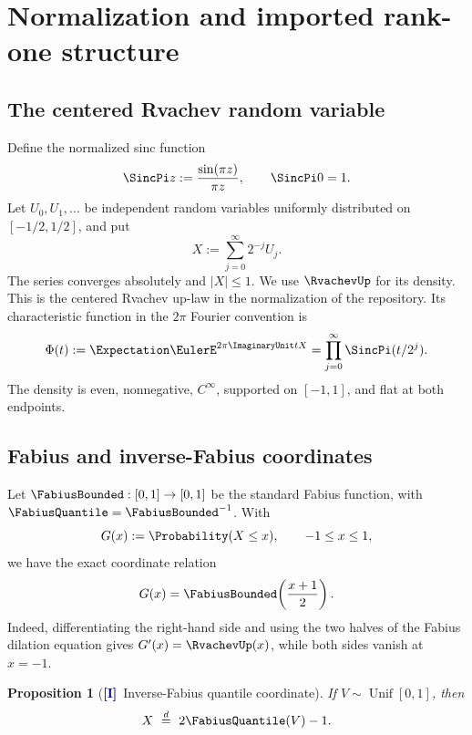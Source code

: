 \documentclass[11pt]{article}
\numberwithin{equation}{section}
\newtheorem{proposition}[theorem]{Proposition}
\theoremstyle{definition}
\theoremstyle{remark}
\newcommand{\Imported}{\textcolor{navy}{\textsf{\textbf{[I]}}}}
\begin{document}
\section{Normalization and imported rank-one structure}
\label{sec:normalization}

\subsection{The centered Rvachev random variable}

Define the normalized sinc function
\begin{equation}
 \SincPi z:=\frac{\sin(\pi z)}{\pi z},\qquad \SincPi0=1.
 \label{eq:sinc-normalized}
\end{equation}
Let $U_0,U_1,\ldots$ be independent random variables uniformly distributed on
$[-1/2,1/2]$, and put
\begin{equation}
 X:=\sum_{j=0}^{\infty}2^{-j}U_j.
 \label{eq:rank-one-series}
\end{equation}
The series converges absolutely and $|X|\le1$.  We use $\RvachevUp$ for its density.
This is the centered Rvachev up-law in the normalization of the repository.
Its characteristic function in the $2\pi$ Fourier convention is
\begin{equation}
 \Phi(t):=\Expectation\EulerE^{2\pi\ImaginaryUnit tX}
 =\prod_{j=0}^{\infty}\SincPi(t/2^j).
 \label{eq:rank-one-Phi}
\end{equation}
The density is even, nonnegative, $C^\infty$, supported on $[-1,1]$, and flat
at both endpoints.

\subsection{Fabius and inverse-Fabius coordinates}

Let $\FabiusBounded:[0,1]\to[0,1]$ be the standard Fabius function, with
$\FabiusQuantile=\FabiusBounded^{-1}$.  With
\begin{equation}
 G(x):=\Probability(X\le x),\qquad -1\le x\le1,
\end{equation}
we have the exact coordinate relation
\begin{equation}
 G(x)=\FabiusBounded\!\left(\frac{x+1}{2}\right).
 \label{eq:CDF-Fabius}
\end{equation}
Indeed, differentiating the right-hand side and using the two halves of the
Fabius dilation equation gives $G'(x)=\RvachevUp(x)$, while both sides vanish at
$x=-1$.

\begin{proposition}[\Imported\ Inverse-Fabius quantile coordinate]
\label{prop:quantile-coordinate}
If $V\sim\operatorname{Unif}[0,1]$, then
\begin{equation}
 X\ \stackrel d=\ 2\FabiusQuantile(V)-1.
 \label{eq:X-quantile}
\end{equation}
\end{proposition}
\end{document}
